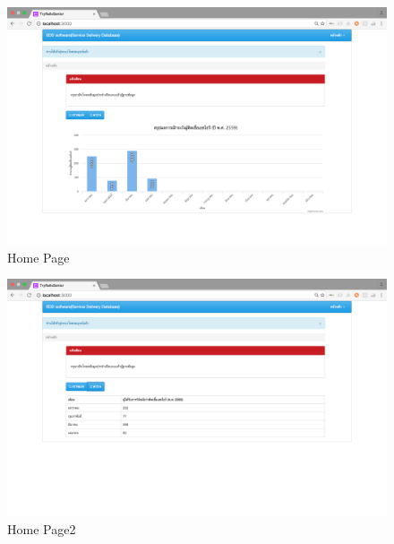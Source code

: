             \FloatBarrier
                \begin{figure}[h!]
                    \centering
                        \includegraphics[width=12cm]{images/chapter-01/mockup_rails/home.png}
                    	\caption{Home Page}
                    	\label{home}
                \end{figure}
            \FloatBarrier
            
            \FloatBarrier
                \begin{figure}[h!]
                    \centering
                        \includegraphics[width=12cm]{images/chapter-01/mockup_rails/home2.png}
                    	\caption{Home Page2}
                    	\label{home2}
                \end{figure}
            \FloatBarrier
        
